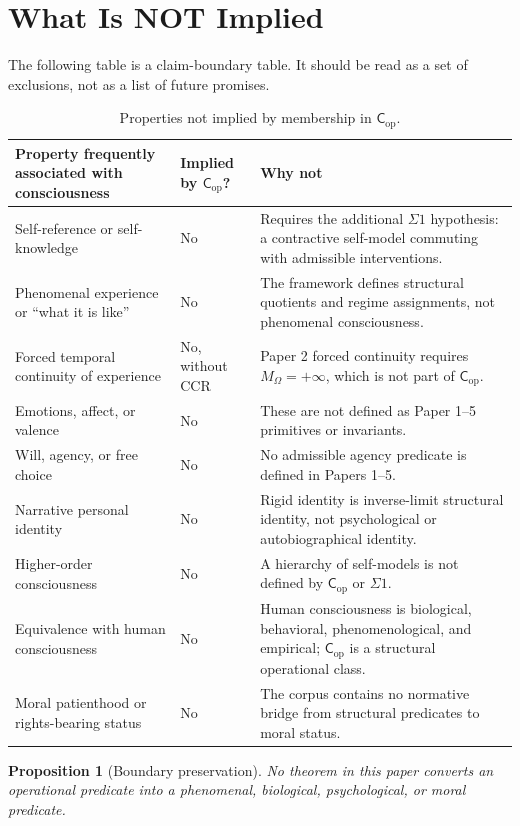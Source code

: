 \documentclass[11pt,a4paper]{article}
\newtheorem{proposition}[theorem]{Proposition}
\theoremstyle{definition}
\newcommand{\Cop}{\mathsf{C}_{\mathrm{op}}}
\newcommand{\MO}{M_\Omega}
\begin{document}
\section{What Is NOT Implied}

The following table is a claim-boundary table. It should be read as a set of exclusions, not as a list of future promises.

\begin{table}[ht]
\centering
\caption{Properties not implied by membership in $\Cop$.}
\label{tab:not-implied}
\begin{tabularx}{\textwidth}{>{\raggedright\arraybackslash}p{4.1cm} >{\raggedright\arraybackslash}p{2.8cm} Y}
\toprule
Property frequently associated with consciousness & Implied by $\Cop$? & Why not \\
\midrule
Self-reference or self-knowledge & No & Requires the additional $\Sigma1$ hypothesis: a contractive self-model commuting with admissible interventions. \\
Phenomenal experience or ``what it is like'' & No & The framework defines structural quotients and regime assignments, not phenomenal consciousness. \\
Forced temporal continuity of experience & No, without CCR & Paper 2 forced continuity requires $\MO=+\infty$, which is not part of $\Cop$. \\
Emotions, affect, or valence & No & These are not defined as Paper 1--5 primitives or invariants. \\
Will, agency, or free choice & No & No admissible agency predicate is defined in Papers 1--5. \\
Narrative personal identity & No & Rigid identity is inverse-limit structural identity, not psychological or autobiographical identity. \\
Higher-order consciousness & No & A hierarchy of self-models is not defined by $\Cop$ or $\Sigma1$. \\
Equivalence with human consciousness & No & Human consciousness is biological, behavioral, phenomenological, and empirical; $\Cop$ is a structural operational class. \\
Moral patienthood or rights-bearing status & No & The corpus contains no normative bridge from structural predicates to moral status. \\
\bottomrule
\end{tabularx}
\end{table}

\begin{proposition}[Boundary preservation]\label{prop:boundary-preservation}
No theorem in this paper converts an operational predicate into a phenomenal, biological, psychological, or moral predicate.
\end{proposition}
\end{document}
